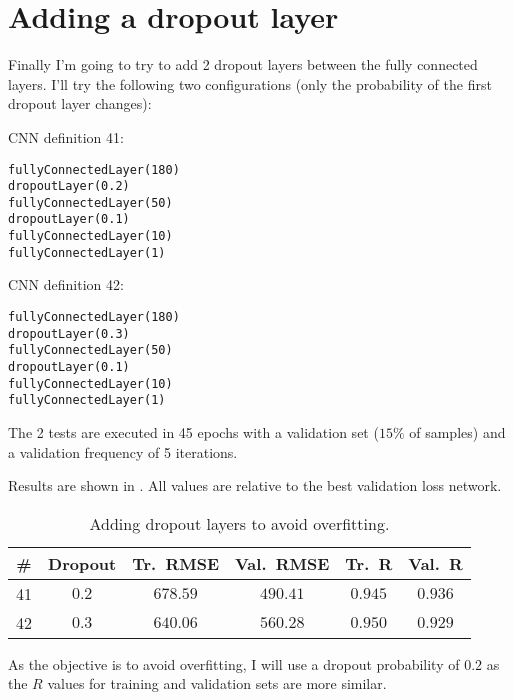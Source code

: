 \section{Adding a dropout layer}\label{sec:cnndropout}

Finally I'm going to try to add 2 dropout layers between the fully connected
layers. I'll try the following two configurations (only the probability of the
first dropout layer changes):

CNN definition 41:
\begin{verbatim}
fullyConnectedLayer(180)
dropoutLayer(0.2)
fullyConnectedLayer(50)
dropoutLayer(0.1)
fullyConnectedLayer(10)
fullyConnectedLayer(1)
\end{verbatim}

CNN definition 42:
\begin{verbatim}
fullyConnectedLayer(180)
dropoutLayer(0.3)
fullyConnectedLayer(50)
dropoutLayer(0.1)
fullyConnectedLayer(10)
fullyConnectedLayer(1)
\end{verbatim}

The 2 tests are executed in 45 epochs with a validation set (\(15\%\) of
samples) and a validation frequency of 5 iterations.

Results are shown in . All values are relative to
the best validation loss network.

\begin{table}[hbtp]
	\centering
	\begin{tabular}{|c|c|c|c|c|c|}
		\toprule
		\# & Dropout & Tr.~RMSE & Val.~RMSE & Tr.~R & Val.~R \\
		\midrule
		41 & \(0.2\) & \(678.59\) & \(490.41\) & \(0.945\) & \(0.936\) \\
		42 & \(0.3\) & \(640.06\) & \(560.28\) & \(0.950\) & \(0.929\) \\
		\bottomrule
	\end{tabular}
	\caption{Adding dropout layers to avoid
	overfitting.}\label{table:cnndropout}
\end{table}

As the objective is to avoid overfitting, I will use a dropout probability of
\(0.2\) as the \(R\) values for training and validation sets are more similar.
